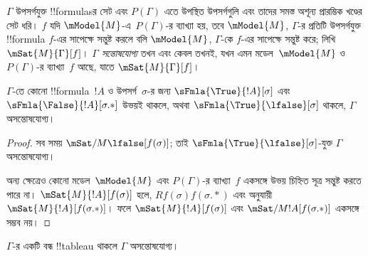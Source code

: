 \documentclass[../../../include/open-logic-section]{subfiles}
\begin{document}
\begin{defn}
  $\Gamma$ উপসর্গযুক্ত !!{formula}sর সেট এবং
  $P(\Gamma)$ এতে উপস্থিত উপসর্গগুলি এবং তাদের সমস্ত
  অশূন্য প্রারম্ভিক খণ্ডের সেট ধরি। $f$ যদি
  $\mModel{M}$-এ~$P(\Gamma)$-র ব্যাখ্যা হয়, তবে
  $\mModel{M}$, $\Gamma$-র প্রতিটি উপসর্গযুক্ত !!{formula}
  $f$-এর সাপেক্ষে সন্তুষ্ট করলে বলি $\mModel{M}$,
  $\Gamma$-কে $f$-এর সাপেক্ষে সন্তুষ্ট করে;
  লিখি $\mSat{M}{\Gamma}[f]$। $\Gamma$ \emph{সন্তোষযোগ্য}
  তখন এবং কেবল তখনই, যখন এমন মডেল~$\mModel{M}$ ও $P(\Gamma)$-র
  ব্যাখ্যা~$f$ আছে, যাতে $\mSat{M}{\Gamma}[f]$।
\end{defn}

\begin{prop}
  $\Gamma$-তে কোনো !!{formula}~$!A$ ও উপসর্গ~$\sigma$-র
  জন্য $\sFmla{\True}{!A}[\sigma]$ এবং
  $\sFmla{\False}{!A}[\sigma.{*}]$ উভয়ই থাকলে, অথবা
  $\sFmla{\True}{\lfalse}[\sigma]$ থাকলে, $\Gamma$
  অসন্তোষযোগ্য।
\end{prop}

\begin{proof}
  সব সময় $\mSat/{M}{\lfalse}[f(\sigma)]$; তাই
  $\sFmla{\True}{\lfalse}[\sigma]$-যুক্ত $\Gamma$
  অসন্তোষযোগ্য।

  অন্য ক্ষেত্রেও কোনো মডেল~$\mModel{M}$ এবং
  $P(\Gamma)$-র ব্যাখ্যা~$f$ একসঙ্গে উভয় চিহ্নিত সূত্র
  সন্তুষ্ট করতে পারে না। $\mSat{M}{!A}[f(\sigma)]$ হলে,
  $Rf(\sigma)f(\sigma.{*})$ এবং
   অনুযায়ী
  $\mSat{M}{!A}[f(\sigma.{*})]$। ফলে
  $\mSat{M}{!A}[f(\sigma)]$ এবং
  $\mSat/{M}{!A}[f(\sigma.{*})]$ একসঙ্গে সম্ভব নয়।
\end{proof}

\begin{thm}[বিশুদ্ধতা]
  $\Gamma$-র একটি বন্ধ !!{tableau} থাকলে $\Gamma$
  অসন্তোষযোগ্য।
\end{thm}
\end{document}
